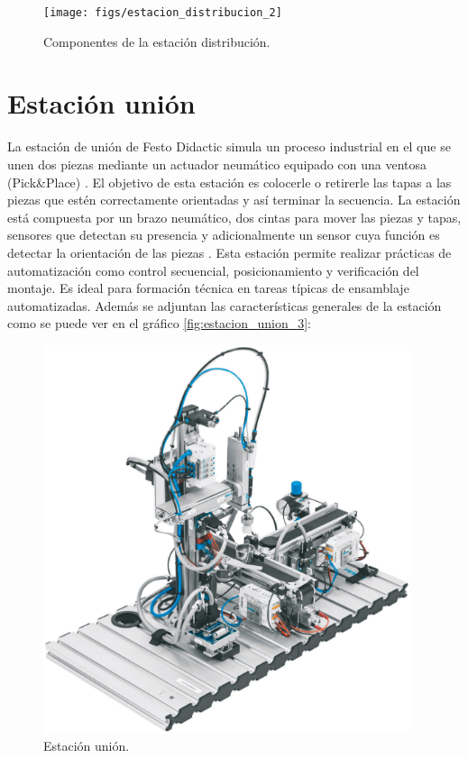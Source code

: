 \clearpage

\begin{figure} [h!]
  \begin{center}
    \texttt{[image: figs/estacion\_distribucion\_2]}
  \end{center}
  \caption{\centering Componentes de la estación distribución.}
  \label{fig:estacion_distribucion_2}
\end{figure} 

\section{Estación unión}

La estación de unión de Festo Didactic simula un proceso industrial en el que se unen dos piezas mediante un actuador neumático equipado con una ventosa (Pick\&Place) \cite{estacion_union}. El objetivo de esta estación es colocerle o retirerle las tapas a las piezas que estén correctamente orientadas y así terminar la secuencia. La estación está compuesta por un brazo neumático, dos cintas para mover las piezas y tapas, sensores que detectan su presencia y adicionalmente un sensor cuya función es detectar la orientación de las piezas \cite{estacion_union}. Esta estación permite realizar prácticas de automatización como control secuencial, posicionamiento y verificación del montaje. Es ideal para formación técnica en tareas típicas de ensamblaje automatizadas. Además se adjuntan las características generales de la estación como se puede ver en el gráfico \ref{fig:estacion_union_3}:

\clearpage

\begin{figure} [h!]
  \begin{center}
    \includegraphics[width=10.75cm]{figs/estacion_union_1}
  \end{center}
  \caption{\centering Estación unión. \cite{estacion_union}}
  \label{fig:estacion_union_1}
\end{figure} 


